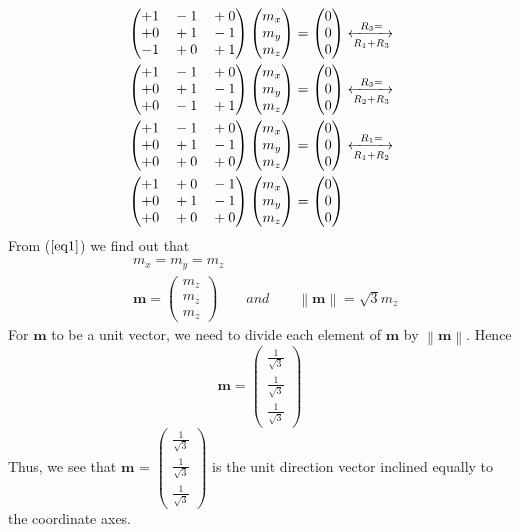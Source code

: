 \documentclass{article}
\newcommand{\myvec}[1]{\ensuremath{\begin{pmatrix}#1\end{pmatrix}}}
\newcommand{\norm}[1]{\left\lVert#1\right\rVert}
\let\vec\mathbf
\begin{document}
\begin{align}
& \myvec{+1 \quad  -1 \quad +0 \\ +0 \quad +1 \quad -1 \\ -1 \quad +0 \quad +1 }\myvec{m_x \\ m_y \\ m_z} = \myvec{0 \\ 0 \\ 0}  \xleftrightarrow[R_1+R_3]{R_3=} \\
& \myvec{+1 \quad  -1 \quad +0 \\ +0 \quad +1 \quad -1 \\ +0 \quad -1 \quad +1 }\myvec{m_x \\ m_y \\ m_z} = \myvec{0 \\ 0 \\ 0} 
\xleftrightarrow[R_2+R_3]{R_3=} \\
& \myvec{+1 \quad  -1 \quad +0 \\ +0 \quad +1 \quad -1 \\ +0 \quad +0 \quad +0 }\myvec{m_x \\ m_y \\ m_z} = \myvec{0 \\ 0 \\ 0} 
\xleftrightarrow[R_1+R_2]{R_1=} \\
& \myvec{+1 \quad  +0 \quad -1 \\ +0 \quad +1 \quad -1 \\ +0 \quad +0 \quad +0 }\myvec{m_x \\ m_y \\ m_z} = \myvec{0 \\ 0 \\ 0} \label{eq1}
\end{align}
From ($\ref{eq1}$) we find out that
\begin{align}
& m_x = m_y = m_z \\
& \vec{m} = \myvec{ m_z\\ m_z \\m_z} \qquad and \qquad \norm{\vec{m}} = \sqrt{3}m_z
\end{align}
For $\vec{m}$ to be a unit vector, we need to divide each element of $\vec{m}$ by $\norm{\vec{m}}$. Hence
\begin{equation*}
\vec{m} = \myvec{\frac{1}{\sqrt{3}} \\ \frac{1}{\sqrt{3}} \\ \frac{1}{\sqrt{3}}}
\end{equation*}
Thus, we see that  $\vec{m}$ = $\myvec{ \frac{1}{\sqrt{3}} \\ \frac{1}{\sqrt{3}} \\ \frac{1}{\sqrt{3}}}$ is the unit direction vector inclined equally to the coordinate axes.
\end{document}
